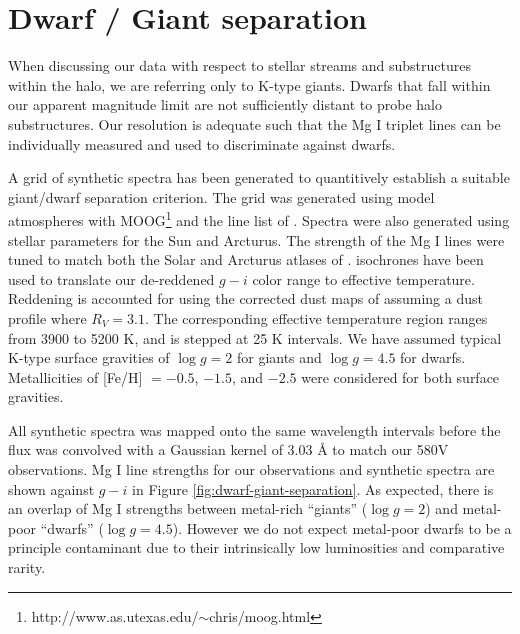 \documentclass[preprint2]{aastex}
\begin{document}
\section{Dwarf / Giant separation}
\label{sec:dwarf-giant-separation}

	When discussing our data with respect to stellar streams and substructures within the halo, we are referring only to K-type giants.  Dwarfs that fall within our apparent magnitude limit are not sufficiently distant to probe halo substructures. Our resolution is adequate such that the Mg I triplet lines can be individually measured and used to discriminate against dwarfs. 	

A grid of synthetic spectra has been generated to quantitively establish a suitable giant/dwarf separation criterion. The grid was generated using \citet{Castelli;Kurucz_2004} model atmospheres with MOOG\footnote{http://www.as.utexas.edu/$\sim$chris/moog.html} and the line list of \citet{Kurucz;Bell_1995}. Spectra were also generated using stellar parameters for the Sun and Arcturus. The strength of the Mg I lines were tuned to match both the Solar and Arcturus atlases of \citet{Hinkle;et-al_2003}. \citet{Girardi;et-al_2004} isochrones have been used to translate our de-reddened $g - i$ color range to effective temperature. Reddening is accounted for using the \citet{Schlafly;Finkbeiner_2011} corrected dust maps of \citet{Schlegel;Finkbeiner;Davis_1998} assuming a \citet{Fitzpatrick_1999} dust profile where $R_V = 3.1$. The corresponding effective temperature region ranges from 3900 to 5200 K, and is stepped at 25 K intervals. We have assumed typical K-type surface gravities of $\log{g} = 2$ for giants and $\log{g} = 4.5$ for dwarfs. Metallicities of [Fe/H] $= -0.5$, $-1.5$, and $-2.5$ were considered for both surface gravities.

All synthetic spectra was mapped onto the same wavelength intervals before the flux was convolved with a Gaussian kernel of 3.03 \AA{} to match our 580V observations. Mg I line strengths for our observations and synthetic spectra are shown against $g - i$ in Figure \ref{fig:dwarf-giant-separation}. As expected, there is an overlap of Mg I strengths between metal-rich ``giants'' ($\log{g} = 2$) and metal-poor ``dwarfs'' ($\log{g} = 4.5$). However we do not expect metal-poor dwarfs to be a principle contaminant due to their intrinsically low luminosities and comparative rarity.
\end{document}
